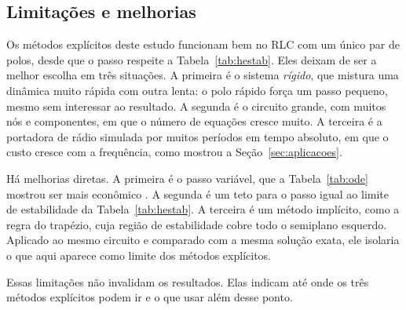 \subsection{Limitações e melhorias}

Os métodos explícitos deste estudo funcionam bem no RLC com um único par de polos, desde que o passo respeite a Tabela~\ref{tab:hestab}. Eles deixam de ser a melhor escolha em três situações. A primeira é o sistema \emph{rígido}, que mistura uma dinâmica muito rápida com outra lenta: o polo rápido força um passo pequeno, mesmo sem interessar ao resultado. A segunda é o circuito grande, com muitos nós e componentes, em que o número de equações cresce muito. A terceira é a portadora de rádio simulada por muitos períodos em tempo absoluto, em que o custo cresce com a frequência, como mostrou a Seção~\ref{sec:aplicacoes}.

Há melhorias diretas. A primeira é o passo variável, que a Tabela~\ref{tab:ode} mostrou ser mais econômico \cite[seção~10.6]{aquino2020}. A segunda é um teto para o passo igual ao limite de estabilidade da Tabela~\ref{tab:hestab}. A terceira é um método implícito, como a regra do trapézio, cuja região de estabilidade cobre todo o semiplano esquerdo. Aplicado ao mesmo circuito e comparado com a mesma solução exata, ele isolaria o que aqui aparece como limite dos métodos explícitos.

Essas limitações não invalidam os resultados. Elas indicam até onde os três métodos explícitos podem ir e o que usar além desse ponto.
